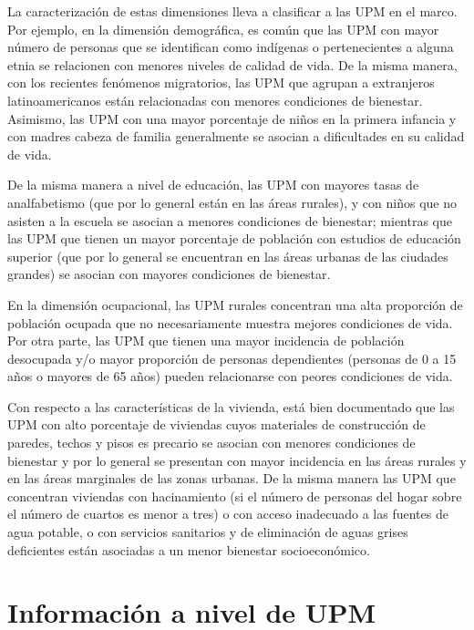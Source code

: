 \documentclass[
  10pt,
  spanish,
]{book}
\begin{document}
La caracterización de estas dimensiones lleva a clasificar a las UPM en el marco. Por ejemplo, en la dimensión demográfica, es común que las UPM con mayor número de personas que se identifican como indígenas o pertenecientes a alguna etnia se relacionen con menores niveles de calidad de vida. De la misma manera, con los recientes fenómenos migratorios, las UPM que agrupan a extranjeros latinoamericanos están relacionadas con menores condiciones de bienestar. Asimismo, las UPM con una mayor porcentaje de niños en la primera infancia y con madres cabeza de familia generalmente se asocian a dificultades en su calidad de vida.

De la misma manera a nivel de educación, las UPM con mayores tasas de analfabetismo (que por lo general están en las áreas rurales), y con niños que no asisten a la escuela se asocian a menores condiciones de bienestar; mientras que las UPM que tienen un mayor porcentaje de población con estudios de educación superior (que por lo general se encuentran en las áreas urbanas de las ciudades grandes) se asocian con mayores condiciones de bienestar.

En la dimensión ocupacional, las UPM rurales concentran una alta proporción de población ocupada que no necesariamente muestra mejores condiciones de vida. Por otra parte, las UPM que tienen una mayor incidencia de población desocupada y/o mayor proporción de personas dependientes (personas de 0 a 15 años o mayores de 65 años) pueden relacionarse con peores condiciones de vida.

Con respecto a las características de la vivienda, está bien documentado que las UPM con alto porcentaje de viviendas cuyos materiales de construcción de paredes, techos y pisos es precario se asocian con menores condiciones de bienestar y por lo general se presentan con mayor incidencia en las áreas rurales y en las áreas marginales de las zonas urbanas. De la misma manera las UPM que concentran viviendas con hacinamiento (si el número de personas del hogar sobre el número de cuartos es menor a tres) o con acceso inadecuado a las fuentes de agua potable, o con servicios sanitarios y de eliminación de aguas grises deficientes están asociadas a un menor bienestar socioeconómico.

\hypertarget{informaciuxf3n-a-nivel-de-upm}{%
\section{Información a nivel de UPM}\label{informaciuxf3n-a-nivel-de-upm}}
\end{document}
